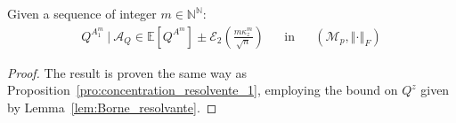 \documentclass[a4papaer, titlepage]{book}
\begin{document}
\begin{proposition}\label{pro:concentration_Q^m}
Given a sequence of integer $m\in \mathbb N^\mathbb N$:
\begin{align*}
  Q^{A_1^m} \ | \ \mathcal A_Q\in \mathbb E[Q^{A^m}] \pm \mathcal E_2\left(\frac{m\kappa_z^m}{\sqrt n}\right)&
  &\text{in}&
  &(\mathcal M_{p},\left\Vert \cdot\right\Vert_F)
\end{align*}
\end{proposition}
\begin{proof}
  The result is proven the same way as Proposition~\ref{pro:concentration_resolvente_1}, employing the bound on $Q^z$ given by Lemma~\ref{lem:Borne_resolvante}. 
\end{proof}

\end{document}

